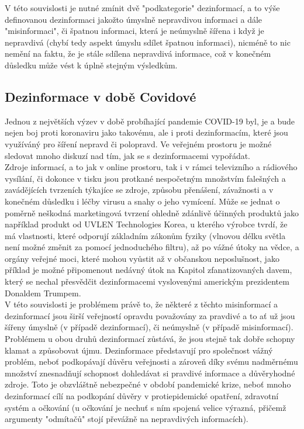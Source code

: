 V této souvislosti je nutné zmínit dvě "podkategorie" dezinformací, a to výše definovanou dezinformaci jakožto úmyslně nepravdivou informaci a dále "misinformaci", či špatnou informaci, která je neúmyslně šířena i když je nepravdivá (chybí tedy aspekt úmyslu sdílet špatnou informaci), nicméně to nic nemění na faktu, že je stále sdílena nepravdivá informace, což v konečném důsledku může vést k úplně stejným výsledkům.\\

\subsection{Dezinformace v době Covidové}

Jednou z největších výzev v době probíhající pandemie COVID-19 byl, je a bude nejen boj proti koronaviru jako takovému, ale i proti dezinformacím, které jsou využíváný pro šíření nepravd či polopravd. Ve veřejném prostoru je možné sledovat mnoho diskuzí nad tím, jak se s dezinformacemi vypořádat.\\

Zdroje informací, a to jak v online prostoru, tak i v rámci televizního a rádiového vysílání, či dokonce v tisku jsou protkané nespočetným množstvím falešných a zavádějících tvrzeních týkajíce se zdroje, způsobu přenášení, závažnosti a v konečném důsledku i léčby virusu a snahy o jeho vymícení. Může se jednat o poměrně neškodná marketingová tvrzení ohledně zdánlivě účinných produktů jako například produkt od UVLEN \textregistered Technologies Korea\cite{uvlen__uvlen_nodate}, u kterého výrobce tvrdí, že má vlastnosti, které odporují základním zákonům fyziky (vlnovou délku světla není možné změnit za pomocí jednoduchého filtru), až po vážné útoky na vědce, a orgány veřejné moci, které mohou vyůstit až v občanskou neposlušnost, jako příklad je možné připomenout nedávný útok na Kapitol zfanatizovaných davem, který se nechal přesvědčit dezinformacemi vyslovenými americkým prezidentem Donaldem Trumpem.\\

V této souvislosti je problémem právě to, že některé z těchto misinformací a dezinformací jsou širší veřejností opravdu považovány za pravdivé a to ať už jsou šířeny úmyslně (v případě dezinformací), či neúmyslně (v případě misinformací). Problémem u obou druhů dezinformací zůstává, že jsou stejně tak dobře schopny klamat a způsobovat újmu. Dezinformace představují pro společnost vážný problém, neboť podkopávají důvěru veřejnosti a zároveň díky svému nadměrnému množství znesnadňují schopnost dohledávat si pravdivé informace a důvěryhodné zdroje. Toto je obzvláštně nebezpečné v období pandemické krize, neboť mnoho dezinformací cílí na podkopání důvěry v protiepidemické opatření, zdravotní systém a očkování (u očkování je nechuť s ním spojená velice výrazná, přičemž argumenty "odmítačů" stojí převážně na nepravdivých informacích).\\ %

